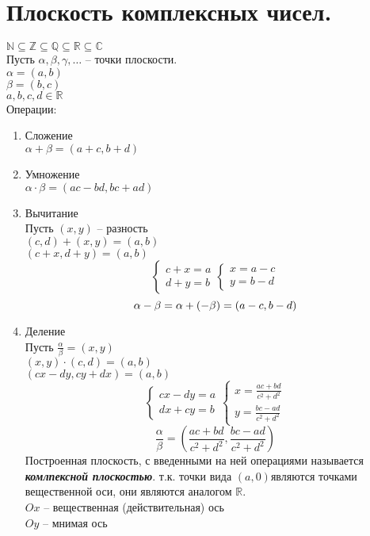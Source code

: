 \documentclass[12pt, fleqn]{article}
\begin{document}
\section{Плоскость комплексных чисел.}
$\mathbb{N}\subseteq\mathbb{Z}\subseteq\mathbb{Q}\subseteq\mathbb{R}\subseteq\mathbb{C}$\\
Пусть $\alpha, \beta, \gamma, \dots $ -- точки плоскости.\\
$\alpha = (a, b)$\\
$\beta=(b,c)$\\
$a, b, c, d \in \mathbb{R}$\\
Операции:
\begin{enumerate}
	\item{Сложение}\\
	$\alpha + \beta = (a+c, b+ d)$
	\item{Умножение}\\
	$\alpha \cdot\beta = (ac-bd, bc+ad)$
	\item{Вычитание}\\
	Пусть $(x, y)$ -- разность\\
	$(c, d) + (x, y) = (a, b)$\\
	$(c+x, d+y)=(a, b)$
	\begin{equation*}
		\begin{cases}
			c+x=a\\
			d+y=b
		\end{cases}
		\begin{cases}
			x=a-c\\
			y=b-d
		\end{cases}
	\end{equation*}
	\begin{equation*}
		\alpha - \beta = \alpha + (-\beta)=(a-c, b-d)\\
	\end{equation*}
	\item{Деление}\\
	 Пусть $\frac\alpha\beta = (x, y)$\\
	$(x, y)\cdot(c, d)=(a, b)$\\
	$(cx-dy, cy+dx) = (a, b)$\\
	\begin{equation*}
		\begin{cases}
			cx-dy=a\\
			dx+cy=b
		\end{cases}
		\begin{cases}
			x=\frac{ac+bd}{c^2+d^2}\\
			y=\frac{bc-ad}{c^2+d^2}
		\end{cases}
	\end{equation*}
	\begin{equation*}
		\frac{\alpha}{\beta}=\left(\frac{ac+bd}{c^2+d^2}, \frac{bc-ad}{c^2+d^2}\right)
	\end{equation*}
	Построенная плоскость, с введенными на ней операциями называется \textit{\textbf{комлпексной плоскостью}}. т.к. точки вида $(a, 0)$являются точками вещественной оси, они являются аналогом $\mathbb{R}$.\\
	$Ox$ -- вещественная (действительная) ось\\
	$Oy$ -- мнимая ось\\
\end{enumerate}
\end{document}
